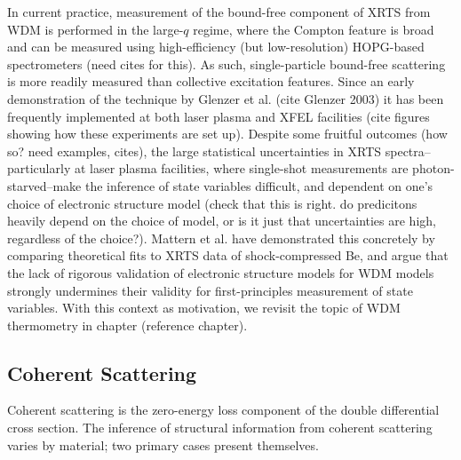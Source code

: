 
In current practice, measurement of the  bound-free component of XRTS from WDM is performed in the large-$q$ regime, where the Compton feature is broad and can be measured using high-efficiency (but low-resolution) HOPG-based spectrometers (need cites for this). As such, single-particle bound-free scattering is more readily measured than collective excitation features. Since an early demonstration of the technique by Glenzer et al. (cite Glenzer 2003) it has been frequently implemented at both laser plasma and XFEL facilities (cite figures showing how these experiments are set up). Despite some fruitful outcomes (how so? need examples, cites), the large statistical uncertainties in XRTS spectra--particularly at laser plasma facilities, where single-shot measurements are photon-starved--make the inference of state variables difficult, and dependent on one's choice of electronic structure model (check that this is right. do predicitons heavily depend on the choice of model, or is it just that uncertainties are high, regardless of the choice?). Mattern et al. have demonstrated this concretely by comparing theoretical fits to XRTS data of shock-compressed Be, and argue that the lack of rigorous validation of electronic structure models for WDM models strongly undermines their validity for first-principles measurement of state variables. With this context as motivation, we revisit the topic of WDM thermometry in chapter (reference chapter).

\label{coh}
\subsection{Coherent Scattering}
Coherent scattering is the zero-energy loss component of the double differential cross section.  The inference of structural information from coherent scattering varies by material; two primary cases present themselves.

%



